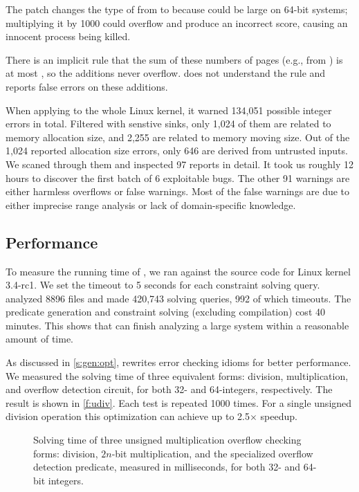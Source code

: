 The patch changes the type of  from  to  because
 could be large on 64-bit systems; multiplying it by
1000 could overflow and produce an incorrect score,
causing an innocent process being killed.

There is an implicit rule that the sum of these numbers of pages
(e.g., from ) is at most , so the
additions never overflow.  \sys does not understand the rule and
reports false errors on these additions.

When applying \sys to the whole Linux kernel, it warned 134,051 possible
integer errors in total. Filtered with senstive sinks, only 1,024 of them are
related to memory allocation size, and 2,255 are related to memory moving size.
Out of the 1,024 reported allocation size errors, only 646 are derived from
untrusted inputs.  We scaned through them and inspected 97 reports in detail.
It took us roughly 12 hours to discover the first batch of 6 exploitable bugs.
The other 91 warnings are either harmless overflows or false warnings.  Most of
the false warnings are due to either imprecise range analysis or lack of
domain-specific knowledge.


\subsection{Performance}
\label{s:eval:perf}

To measure the running time of \sys, we ran \sys against the source
code for Linux kernel 3.4-rc1.  We set the timeout
to 5 seconds for each constraint solving query.   \sys analyzed
8896 files and made 420,743 solving queries, 992 of which timeouts.
The predicate generation and constraint solving (excluding compilation)
cost 40 minutes.  This shows that \sys can finish analyzing a large
system within a reasonable amount of time.

As discussed in \autoref{s:gen:opt}, \sys rewrites error checking
idioms for better performance.  We measured the solving time of three
equivalent forms: division, multiplication, and overflow detection
circuit, for both 32- and 64-integers, respectively.  The result
is shown in \autoref{f:udiv}.  Each test is repeated 1000 times.
For a single unsigned division operation this optimization can
achieve up to 2.5$\times$ speedup.

\begin{figure}
\centering

\caption{Solving time of three unsigned multiplication overflow
checking forms: division, $2n$-bit multiplication, and the specialized
overflow detection predicate, measured in milliseconds, for both
32- and 64-bit integers.}
\label{f:udiv}
\end{figure}
